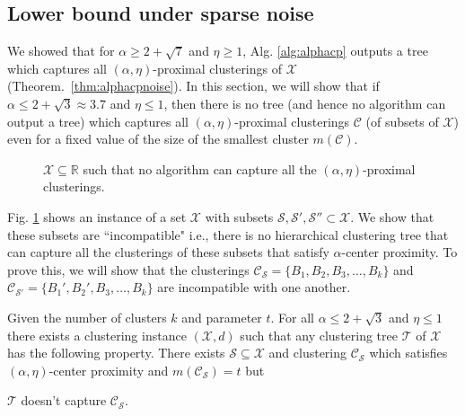 \documentclass[anon,12pt]{colt2016} %
\newcommand{\mc}{\mathcal}
\begin{document}

\subsection{Lower bound under sparse noise}
\label{section:alphaLowerBoundSparse}

We showed that for $\alpha \ge 2 + \sqrt{7}$ and $\eta \ge 1$, Alg. \ref{alg:alphacp} outputs a tree which captures all $(\alpha, \eta)$-proximal clusterings of $\mc X$ (Theorem.~\ref{thm:alphacpnoise}). In this section, we will show that if $\alpha \le 2 + \sqrt{3} \approx 3.7$ and $\eta \le 1$, then there is no tree (and hence no algorithm can output a tree) which captures all $(\alpha, \eta)$-proximal clusterings $\mc C$ (of subsets of $\mc X$) even for a fixed value of the size of the smallest cluster $m(\mc C)$.

\begin{figure}

\caption{$\mc X \subseteq \mathbb{R}$ such that no algorithm can capture all the $(\alpha, \eta)$-proximal clusterings.}
\label{fig:noalgalphacp}
\end{figure}

Fig. \ref{fig:noalgalphacp} shows an instance of a set $\mc X$ with subsets $\mc S, \mc S', \mc S'' \subset \mc X$. We show that these subsets are ``incompatible" i.e., there is no  hierarchical clustering tree that can capture all the clusterings of these subsets that satisfy $\alpha$-center proximity. To prove this, we will show that the clusterings $\mc C_{\mc S} = \{B_1, B_2, B_3, \ldots, B_k\}$ and $\mc C_{\mc S'} = \{B_1', B_2', B_3, \ldots, B_k\}$ are incompatible with one another.

\begin{theorem}
\label{thm:noalgalphacp}
Given the number of clusters $k$ and parameter $t$. For all $\alpha \le 2+\sqrt{3}$ and $\eta \le 1$ there exists a clustering instance $(\mc X, d)$ such that any clustering tree $\mc T$ of $\mc X$ has  the following property. There exists $\mc S \subseteq \mc X$ and clustering $\mc C_{\mc S}$ which satisfies $(\alpha, \eta)$-center proximity and $ m(\mc C_{\mc S}) = t$ but 

$\mc T$ doesn't capture $\mc C_{\mc S}$.
\end{theorem}
\end{document}
